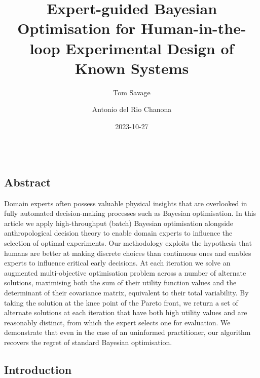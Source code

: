 \documentclass[
  letterpaper,
  DIV=11,
  numbers=noendperiod,
  oneside]{scrartcl}
\title{Expert-guided Bayesian Optimisation for Human-in-the-loop
Experimental Design of Known Systems}
\author{Tom Savage \and Antonio del Rio Chanona}
\date{2023-10-27}
\renewcommand*\contentsname{Table of contents}
\newcommand\contentsname{Table of contents}
\begin{document}
\maketitle
\ifdefined\Shaded\renewenvironment{Shaded}{\begin{tcolorbox}[enhanced, boxrule=0pt, interior hidden, borderline west={3pt}{0pt}{shadecolor}, sharp corners, frame hidden, breakable]}{\end{tcolorbox}}\fi

\renewcommand*\contentsname{Table of contents}
{
\hypersetup{linkcolor=}
\setcounter{tocdepth}{3}
\tableofcontents
}
\[
\DeclareMathOperator*{\argmax}{arg\,max}
\]

\hypertarget{abstract}{%
\subsection*{Abstract}\label{abstract}}

Domain experts often possess valuable physical insights that are
overlooked in fully automated decision-making processes such as Bayesian
optimisation. In this article we apply high-throughput (batch) Bayesian
optimisation alongside anthropological decision theory to enable domain
experts to influence the selection of optimal experiments. Our
methodology exploits the hypothesis that humans are better at making
discrete choices than continuous ones and enables experts to influence
critical early decisions. At each iteration we solve an augmented
multi-objective optimisation problem across a number of alternate
solutions, maximising both the sum of their utility function values and
the determinant of their covariance matrix, equivalent to their total
variability. By taking the solution at the knee point of the Pareto
front, we return a set of alternate solutions at each iteration that
have both high utility values and are reasonably distinct, from which
the expert selects one for evaluation. We demonstrate that even in the
case of an uninformed practitioner, our algorithm recovers the regret of
standard Bayesian optimisation.

\hypertarget{introduction}{%
\subsection{Introduction}\label{introduction}}
\end{document}
